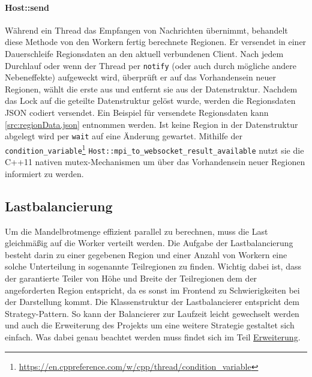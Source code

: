 \begin{figure}
	
\end{figure}

\begin{figure}
	
\end{figure}

\paragraph{Host::send}\label{cls:Host::send}

Während ein Thread das Empfangen von Nachrichten übernimmt, behandelt diese Methode von den Workern fertig berechnete Regionen.
Er versendet in einer Dauerschleife Regionsdaten an den aktuell verbundenen Client.
Nach jedem Durchlauf oder wenn der Thread per \verb|notify| (oder auch durch mögliche andere Nebeneffekte) aufgeweckt wird,
überprüft er auf das Vorhandensein neuer Regionen, wählt die erste aus und entfernt sie aus der Datenstruktur.
Nachdem das Lock auf die geteilte Datenstruktur gelöst wurde, werden die Regionsdaten JSON codiert versendet.
Ein Beispiel für versendete Regionsdaten kann \autoref{src:regionData.json} entnommen werden.
Ist keine Region in der Datenstruktur abgelegt wird per \verb|wait| auf eine Änderung gewartet.
Mithilfe der \verb|condition_variable|\footnote{\url{https://en.cppreference.com/w/cpp/thread/condition_variable}} \verb|Host::mpi_to_websocket_result_available|
nutzt sie die C++11 nativen mutex-Mechanismen um über das Vorhandensein neuer Regionen informiert zu werden.

\begin{figure}
	
\end{figure}

\subsection{Lastbalancierung} \label{sec:load_balancing}
Um die Mandelbrotmenge effizient parallel zu berechnen, muss die Last gleichmäßig auf die Worker verteilt werden.
Die Aufgabe der Lastbalancierung besteht darin zu einer gegebenen Region und einer Anzahl von Workern eine solche Unterteilung in sogenannte Teilregionen zu finden.
Wichtig dabei ist, dass der garantierte Teiler von Höhe und Breite der Teilregionen dem der angeforderten Region entspricht, da es sonst im Frontend zu Schwierigkeiten bei der Darstellung kommt.
Die Klassenstruktur der Lastbalancierer entspricht dem Strategy-Pattern. So kann der Balancierer zur Laufzeit leicht gewechselt werden und auch die Erweiterung des Projekts um eine weitere Strategie gestaltet sich einfach.
Was dabei genau beachtet werden muss findet sich im Teil \hyperref[lastbalancierung_erweiterung]{Erweiterung}.



